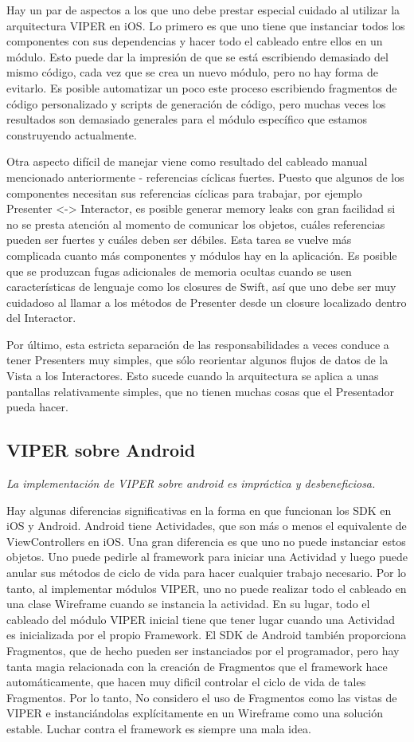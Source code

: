 Hay un par de aspectos a los que uno debe prestar especial cuidado al utilizar la arquitectura VIPER en iOS. Lo primero es que uno tiene que instanciar todos los componentes con sus dependencias y hacer todo el cableado entre ellos en un módulo. Esto puede dar la impresión de que se está escribiendo demasiado del mismo código, cada vez que se crea un nuevo módulo, pero no hay forma de evitarlo. Es posible automatizar un poco este proceso escribiendo fragmentos de código personalizado y scripts de generación de código, pero muchas veces los resultados son demasiado generales para el módulo específico que estamos construyendo actualmente.

Otra aspecto difícil de manejar viene como resultado del cableado manual mencionado anteriormente - referencias cíclicas fuertes. Puesto que algunos de los componentes necesitan sus referencias cíclicas para trabajar, por ejemplo Presenter <-> Interactor, es posible generar memory leaks con gran facilidad si no se presta atención al momento de comunicar los objetos, cuáles referencias pueden ser fuertes y cuáles deben ser débiles. Esta tarea se vuelve más complicada cuanto más componentes y módulos hay en la aplicación. Es posible que se produzcan fugas adicionales de memoria ocultas cuando se usen características de lenguaje como los closures de Swift, así que uno debe ser muy cuidadoso al llamar a los métodos de Presenter desde un closure localizado dentro del Interactor.

Por último, esta estricta separación de las responsabilidades a veces conduce a tener Presenters muy simples, que sólo reorientar algunos flujos de datos de la Vista a los Interactores. Esto sucede cuando la arquitectura se aplica a unas pantallas relativamente simples, que no tienen muchas cosas que el Presentador pueda hacer.

\subsection{VIPER sobre Android}
\textit{La implementación de VIPER sobre android es impráctica y desbeneficiosa.}

Hay algunas diferencias significativas en la forma en que funcionan los SDK en iOS y Android. Android tiene Actividades, que son más o menos el equivalente de ViewControllers en iOS. Una gran diferencia es que uno no puede instanciar estos objetos. Uno puede pedirle al framework para iniciar una Actividad y luego puede anular sus métodos de ciclo de vida para hacer cualquier trabajo necesario. Por lo tanto, al implementar módulos VIPER, uno no puede realizar todo el cableado en una clase Wireframe cuando se instancia la actividad. En su lugar, todo el cableado del módulo VIPER inicial tiene que tener lugar cuando una Actividad es inicializada por el propio Framework. El SDK de Android también proporciona Fragmentos, que de hecho pueden ser instanciados por el programador, pero hay tanta magia relacionada con la creación de Fragmentos que el framework hace automáticamente, que hacen muy dificil controlar el ciclo de vida de tales Fragmentos. Por lo tanto, No considero el uso de Fragmentos como las vistas de VIPER e instanciándolas explícitamente en un Wireframe como una solución estable. Luchar contra el framework es siempre una mala idea.

